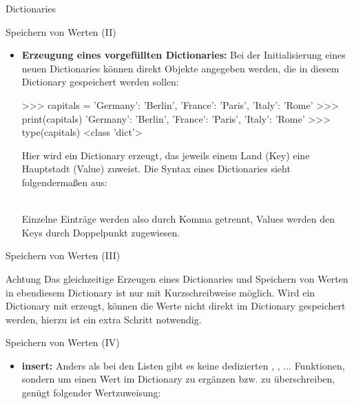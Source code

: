 \begin{subsection}{Dictionaries}
\begin{frame}[fragile]{Speichern von Werten (II)}
           \begin{itemize}
               \item \textbf{Erzeugung eines vorgefüllten Dictionaries:} Bei der Initialisierung eines neuen Dictionaries können direkt Objekte angegeben werden, die in diesem Dictionary gespeichert werden sollen:

\begin{pyconcode}
>>> capitals = {'Germany': 'Berlin', 'France': 'Paris', 'Italy': 'Rome'}
>>> print(capitals)
{'Germany': 'Berlin', 'France': 'Paris', 'Italy': 'Rome'}
>>> type(capitals)
<class 'dict'>
\end{pyconcode}

            Hier wird ein Dictionary erzeugt, das jeweils einem Land (Key) eine Hauptstadt (Value) zuweist. Die Syntax eines Dictionaries sieht folgendermaßen aus: \\~\
            
            
            Einzelne Einträge werden also durch Komma getrennt, Values werden den Keys durch Doppelpunkt zugewiesen.

           \end{itemize}
    
        \end{frame}
        
        \begin{frame}[fragile]{Speichern von Werten (III)}
            
          \begin{alertblock}{Achtung}
            Das gleichzeitige Erzeugen eines Dictionaries und Speichern von Werten in ebendiesem Dictionary ist nur mit Kurzschreibweise möglich. Wird ein Dictionary mit  erzeugt, können die Werte nicht direkt im Dictionary gespeichert werden, hierzu ist ein extra Schritt notwendig.
          \end{alertblock}
    
        \end{frame}
        
        
         \begin{frame}[fragile]{Speichern von Werten (IV)}
            
            \begin{itemize}
                \item \textbf{insert:} Anders als bei den Listen gibt es keine dedizierten , , ... Funktionen, sondern um einen Wert im Dictionary zu ergänzen bzw. zu überschreiben, genügt folgender Wertzuweisung:\\~\
                

\end{itemize}
\end{frame}
\end{subsection}
